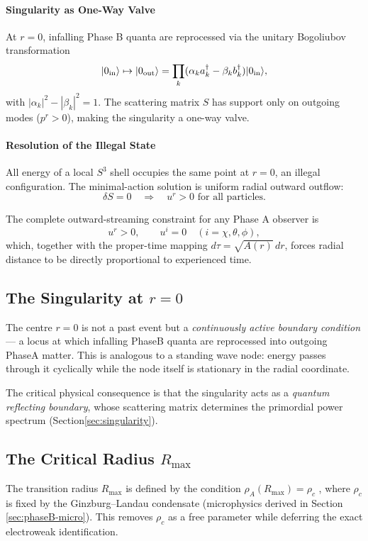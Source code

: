 \documentclass[10pt,twocolumn]{article}
\theoremstyle{definition}
\newcommand{\Rmax}{R_{\max}}
\newcommand{\rhoA}{\rho_{A}}
\newcommand{\rhoc}{\rho_{c}}
\begin{document}
\paragraph{Singularity as One-Way Valve}  
At \( r=0 \), infalling Phase B quanta are reprocessed via the unitary Bogoliubov transformation
\[
|0_{\rm in}\rangle \mapsto |0_{\rm out}\rangle = \prod_k (\alpha_k a_k^\dagger - \beta_k b_k^\dagger) |0_{\rm in}\rangle,
\]
with \( |\alpha_k|^2 - |\beta_k|^2 = 1 \). The scattering matrix \( S \) has support only on outgoing modes (\( p^r > 0 \)), making the singularity a one-way valve.

\paragraph{Resolution of the Illegal State}  
All energy of a local \( S^3 \) shell occupies the same point at \( r=0 \), an illegal configuration. The minimal-action solution is uniform radial outward outflow:
\[
\delta S = 0 \quad \Rightarrow \quad u^r > 0 \text{ for all particles}.
\]

The complete outward-streaming constraint for any Phase A observer is
\[
u^r > 0, \qquad u^i = 0 \quad (i = \chi,\theta,\phi),
\]
which, together with the proper-time mapping \( d\tau = \sqrt{A(r)}\,dr \), forces radial distance to be directly proportional to experienced time.



\subsection{The Singularity at \( r=0 \)}
\label{sec:singularity-topology}

The centre \( r=0 \) is not a past event but a
\emph{continuously active boundary condition} --- a locus
at which infalling Phase\nobreakspace{}B quanta are reprocessed into
outgoing Phase\nobreakspace{}A matter.  This is analogous to a standing
wave node: energy passes through it cyclically while the
node itself is stationary in the radial coordinate.

The critical physical consequence is that the singularity
acts as a \emph{quantum reflecting boundary}, whose
scattering matrix determines the primordial power spectrum
(Section\nobreakspace{}\ref{sec:singularity}).

\subsection{The Critical Radius \(\Rmax\)}
\label{sec:rmax}
The transition radius \(\Rmax\) is defined by the condition \(\rhoA(\Rmax)=\rhoc\) \(\label{eq:Rmax-derived}\),
where \(\rhoc\) is fixed by the Ginzburg--Landau condensate (microphysics derived in Section \ref{sec:phaseB-micro}).
This removes \(\rhoc\) as a free parameter while deferring the exact electroweak identification.
\end{document}
